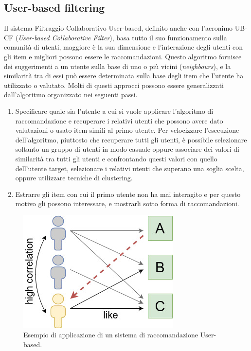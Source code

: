 \subsection{User-based filtering}
Il sistema Filtraggio Collaborativo User-based, definito anche con l'acronimo UB-CF (\textit{User-based Collaborative Filter}), basa tutto il suo 
funzionamento sulla comunità di utenti, maggiore è la sua dimensione e l'interazione degli utenti con gli item e migliori possono essere le 
raccomandazioni. Questo algoritmo fornisce dei suggerimenti a un utente sulla base di uno o più vicini (\textit{neighbours}), e la similarità 
tra di essi può essere determinata sulla base degli item che l'utente ha utilizzato o valutato.\hfill\break
Molti di questi approcci possono essere generalizzati dall'algoritmo organizzato nei seguenti passi.
\begin{enumerate}
    \item Specificare quale sia l'utente a cui si vuole applicare l'algoritmo di raccomandazione e recuperare i relativi utenti che possono 
    avere dato valutazioni o usato item simili al primo utente. Per velocizzare l'esecuzione dell'algoritmo, piuttosto che recuperare tutti 
    gli utenti, è possibile selezionare soltanto un gruppo di utenti in modo casuale oppure associare dei valori di similarità tra 
    tutti gli utenti e confrontando questi valori con quello dell'utente target, selezionare i relativi utenti che superano una soglia 
    scelta, oppure utilizzare tecniche di clustering.
    \item Estrarre gli item con cui il primo utente non ha mai interagito e per questo motivo gli possono interessare, e mostrarli 
    sotto forma di raccomandazioni.
\end{enumerate}
\begin{figure}[ht!]
    \centering
    \includegraphics[scale=0.7]{images/UB_CF_ex.jpg}
    \caption[Applicazione di un sistema di raccomandazione UB-CF]{Esempio di applicazione di un sistema di raccomandazione User-based.}
    \label{fig:UB_CF}
\end{figure}
